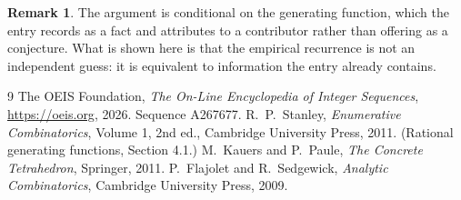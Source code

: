 \documentclass[11pt,a4paper]{article}
\theoremstyle{plain}
\theoremstyle{definition}
\newtheorem{remark}[theorem]{Remark}
\begin{document}
\begin{remark}
The argument is conditional on the generating function, which the entry records as a fact and
attributes to a contributor rather than offering as a conjecture. What is shown here is that
the empirical recurrence is not an independent guess: it is equivalent to information the
entry already contains.
\end{remark}

\begin{thebibliography}{9}
 The OEIS Foundation, \emph{The On-Line Encyclopedia of Integer
Sequences}, \url{https://oeis.org}, 2026. Sequence A267677.
 R.~P.~Stanley, \emph{Enumerative Combinatorics}, Volume 1, 2nd ed.,
Cambridge University Press, 2011. (Rational generating functions, Section 4.1.)
 M.~Kauers and P.~Paule, \emph{The Concrete Tetrahedron}, Springer, 2011.
 P.~Flajolet and R.~Sedgewick, \emph{Analytic Combinatorics}, Cambridge
University Press, 2009.
\end{thebibliography}
\end{document}
